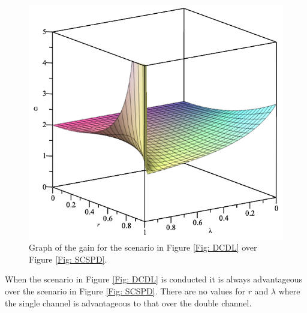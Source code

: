 \documentclass[twocolumn]{article}
\begin{document}
\begin{figure}[ht]
    \centering
    \includegraphics[scale=0.35]{Depolarizing-Double-Channel-Lambda-Gain-Graph.png}
    \caption{\footnotesize{Graph of the gain for the scenario in Figure \ref{Fig: DCDL} over Figure \ref{Fig: SCSPD}.}}
    \label{Fig: DCDLGG}
\end{figure}
\par \noindent
When the scenario in Figure \ref{Fig: DCDL} is conducted it is always advantageous over the scenario in Figure \ref{Fig: SCSPD}. There are no values for $r$ and $\lambda$ where the single channel is advantageous to that over the double channel.
\end{document}

